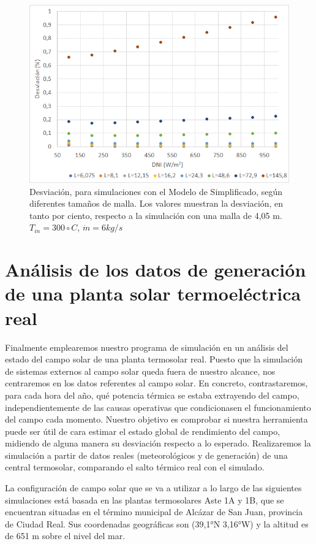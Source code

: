 \begin{figure}[!h]
\includegraphics[width=0.9\linewidth]{images/desviacionmodelsimplificadomalla.png}
\caption{Desviación, para simulaciones con el Modelo de Simplificado, según diferentes tamaños de malla. Los valores muestran la desviación, en tanto por ciento, respecto a la simulación con una malla de 4,05 m. $T_{in}=300 \circ C$, $\dot m = 6 kg/s$} 
\label{fig:desviacionmodelsimplificado}
\end{figure}



\section{Análisis de los datos de generación de una planta solar termoeléctrica real}
\label{descripcion-central}

Finalmente emplearemos nuestro programa de simulación en un análisis del estado del campo solar de una planta termosolar real. Puesto que la simulación de sistemas externos al campo solar queda fuera de nuestro alcance, nos centraremos en los datos referentes al campo solar. En concreto, contrastaremos, para cada  hora del año, qué potencia térmica se estaba extrayendo del campo, independientemente de las causas operativas que condicionasen el funcionamiento del campo cada momento. Nuestro objetivo es comprobar si nuestra herramienta puede ser útil de cara estimar el estado global de rendimiento del campo, midiendo de alguna manera su desviación respecto a lo esperado. Realizaremos la simulación a partir de datos reales (meteorológicos y de generación) de una central termosolar, comparando el salto térmico real con el simulado. 

La configuración de campo solar que se va a utilizar a lo largo de las siguientes simulaciones está basada en las plantas termosolares Aste 1A y 1B, que se encuentran situadas en el término municipal de Alcázar de San Juan, provincia de Ciudad Real. Sus coordenadas geográficas son (39,1°N 3,16°W) y la altitud es de 651 m sobre el nivel del mar.

